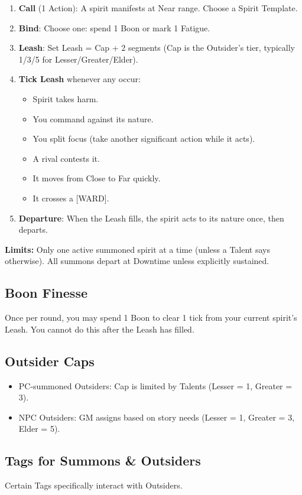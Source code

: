 \begin{enumerate}
  \item \textbf{Call} (1 Action): A spirit manifests at Near range. Choose a Spirit Template.
  \item \textbf{Bind}: Choose one: spend 1 Boon or mark 1 Fatigue.
  \item \textbf{Leash}: Set Leash = Cap + 2 segments (Cap is the Outsider's tier, typically 1/3/5 for Lesser/Greater/Elder).
  \item \textbf{Tick Leash} whenever any occur:
    \begin{itemize}
      \item Spirit takes harm.
      \item You command against its nature.
      \item You split focus (take another significant action while it acts).
      \item A rival contests it.
      \item It moves from Close to Far quickly.
      \item It crosses a [WARD].
    \end{itemize}
  \item \textbf{Departure}: When the Leash fills, the spirit acts to its nature once, then departs.
\end{enumerate}

\textbf{Limits:} Only one active summoned spirit at a time (unless a Talent says otherwise). All summons depart at Downtime unless explicitly sustained.

\subsection{Boon Finesse}
Once per round, you may spend 1 Boon to clear 1 tick from your current spirit's Leash. You cannot do this after the Leash has filled.

\subsection{Outsider Caps}
\begin{itemize}
  \item PC-summoned Outsiders: Cap is limited by Talents (Lesser = 1, Greater = 3).
  \item NPC Outsiders: GM assigns based on story needs (Lesser = 1, Greater = 3, Elder = 5).
\end{itemize}

\subsection{Tags for Summons \& Outsiders}
Certain Tags specifically interact with Outsiders.

